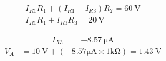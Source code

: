 \documentclass{article}
\begin{document}
\begin{equation*}
  \begin{aligned}
    I_{R1} R_1 + \left( I_{R1} - I_{R3}  \right) R_2 = 60 \  \mathrm{V} \\
    I_{R1} R_1 + I_{R3} R_3 = 20 \  \mathrm{V}
  \end{aligned}
\end{equation*}

\begin{equation*}
  \begin{aligned}
    I_{R3} &= - 8.57 \  \mathrm{\mu A}
  \end{aligned}
\end{equation*}
\begin{equation*}
  \begin{aligned}
    V_A &= 10 \  \mathrm{V} + \left( -8.57 \mathrm{\mu A} \times 1 \mathrm{k \Omega}\right) = 1.43 \ \mathrm{V}
  \end{aligned}
\end{equation*}
\end{document}
